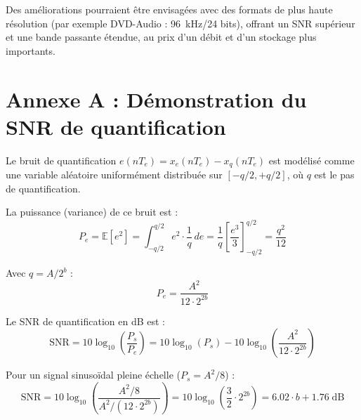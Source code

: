 \documentclass[12pt, a4paper, french]{article}
\newcommand{\SNR}{\text{SNR}}
\newcommand{\dB}{\text{dB}}
\begin{document}
Des améliorations pourraient être envisagées avec des formats de plus haute résolution (par exemple DVD-Audio : \SI{96}{\kilo\hertz}/24 bits), offrant un SNR supérieur et une bande passante étendue, au prix d'un débit et d'un stockage plus importants.

\newpage
\printbibliography[title={Références}]

\newpage
\listoffigures
\listoftables

\newpage
\appendix
\section{Annexe A : Démonstration du SNR de quantification}

Le bruit de quantification $e(nT_e) = x_e(nT_e) - x_q(nT_e)$ est modélisé comme une variable aléatoire uniformément distribuée sur $[-q/2, +q/2]$, où $q$ est le pas de quantification.

La puissance (variance) de ce bruit est :
\begin{equation}
    P_e = \mathbb{E}[e^2] = \int_{-q/2}^{q/2} e^2 \cdot \frac{1}{q} \, de = \frac{1}{q} \left[\frac{e^3}{3}\right]_{-q/2}^{q/2} = \frac{q^2}{12}
\end{equation}

Avec $q = A/2^b$ :
\begin{equation}
    P_e = \frac{A^2}{12 \cdot 2^{2b}}
\end{equation}

Le SNR de quantification en dB est :
\begin{equation}
    \SNR = 10\log_{10}\left(\frac{P_s}{P_e}\right) = 10\log_{10}(P_s) - 10\log_{10}\left(\frac{A^2}{12 \cdot 2^{2b}}\right)
\end{equation}

Pour un signal sinusoïdal pleine échelle ($P_s = A^2/8$) :
\begin{equation}
    \SNR = 10\log_{10}\left(\frac{A^2/8}{A^2/(12 \cdot 2^{2b})}\right) = 10\log_{10}\left(\frac{3}{2} \cdot 2^{2b}\right) = 6.02 \cdot b + 1.76 \; \dB
\end{equation}
\end{document}
